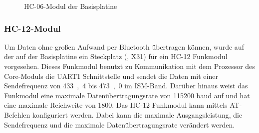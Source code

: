 \begin{figure}[htb]
    \centering
    \qquad
    \qquad
    \caption[HC-06-Modul der Basisplatine]{HC-06-Modul der \gls{Basisplatine}}
    \label{fig:basisplatine-hc06}
\end{figure}

\subsubsection{HC-12-Modul}
Um Daten ohne großen Aufwand per Bluetooth übertragen können, wurde auf der auf der \gls{Basisplatine} ein Steckplatz (, X31) für ein HC-12 Funkmodul vorgesehen. Dieses Funkmodul benutzt zu Kommunikation mit dem Prozessor des \gls{Core-Modul}s die UART1 Schnittstelle und sendet die Daten mit einer Sendefrequenz von \unit{433,4}{\mega\hertz} bis \unit{473,0}{\mega\hertz} im ISM-Band. Darüber hinaus weist das Funkmodul eine maximale Datenübertragungsrate von 115200 baud auf und hat eine maximale Reichweite von \unit{1800}{\metre}. Das HC-12 Funkmodul kann mittels AT-Befehlen konfiguriert werden. Dabei kann die maximale Ausgangsleistung, die Sendefrequenz und die maximale Datenübertragungsrate verändert werden.

